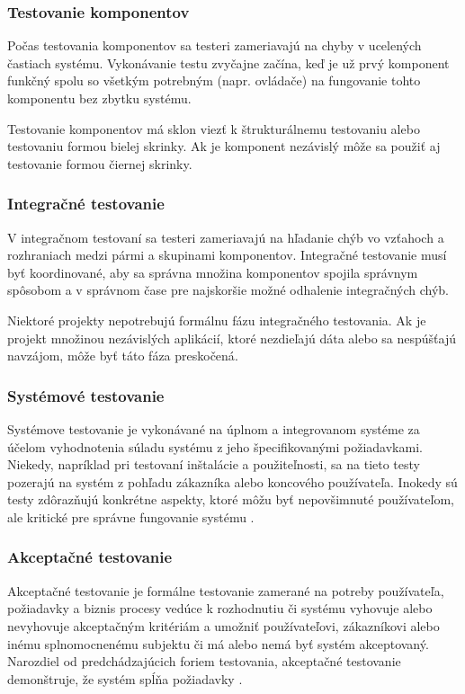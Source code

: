 \documentclass[11pt,twoside,slovak,a4paper]{article}
\begin{document}
		\subsubsection{Testovanie komponentov} 
		
			Počas testovania komponentov sa testeri zameriavajú na chyby v ucelených častiach systému. Vykonávanie testu zvyčajne začína, keď je už prvý komponent funkčný spolu so všetkým potrebným (napr. ovládače) na fungovanie tohto komponentu bez zbytku systému\cite{Alba2008}.
			
			Testovanie komponentov má sklon viezť k štrukturálnemu testovaniu alebo testovaniu formou bielej skrinky. Ak je komponent nezávislý môže sa použiť aj testovanie formou čiernej skrinky\cite{Alba2008}.
		\subsubsection{Integračné testovanie} 
		
			V integračnom testovaní sa testeri zameriavajú na hľadanie chýb vo vzťahoch a rozhraniach medzi pármi a skupinami komponentov. Integračné testovanie musí byť koordinované, aby sa správna množina komponentov spojila správnym spôsobom a v správnom čase	pre najskoršie možné odhalenie integračných chýb\cite{Alba2008}.
			
			Niektoré projekty nepotrebujú formálnu fázu integračného testovania. Ak je projekt množinou nezávislých aplikácií, ktoré nezdieľajú dáta alebo sa nespúšťajú navzájom, môže byť táto fáza preskočená\cite{Alba2008}.
		\subsubsection{Systémové testovanie} 
				
			Systémove testovanie je vykonávané na úplnom a integrovanom systéme za účelom vyhodnotenia súladu systému z jeho špecifikovanými požiadavkami\cite{Dictionary}. 
			Niekedy, napríklad pri testovaní inštalácie a použiteľnosti, sa na tieto testy pozerajú na systém z pohľadu zákazníka alebo koncového používateľa. Inokedy sú testy zdôrazňujú konkrétne aspekty, ktoré môžu byť nepovšimnuté používateľom, ale kritické pre správne fungovanie systému \cite{Alba2008}.
	\subsubsection{Akceptačné testovanie}	
	
			Akceptačné testovanie je formálne testovanie zamerané na potreby používateľa, požiadavky a  biznis procesy vedúce k rozhodnutiu či systému vyhovuje alebo nevyhovuje akceptačným kritériám a umožniť používateľovi, zákazníkovi alebo inému splnomocnenému subjektu či má alebo nemá byť systém akceptovaný\cite{Veenendaal2010}. Narozdiel od predchádzajúcich foriem testovania, akceptačné testovanie demonštruje, že systém spĺňa požiadavky \cite{Alba2008}. 
			
\end{document}
